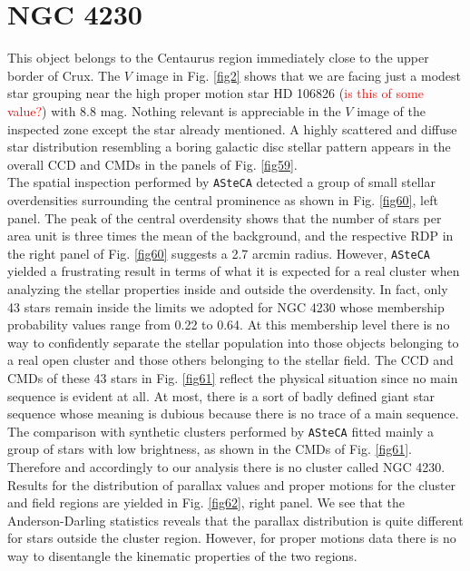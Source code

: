 \documentclass{aa}
\begin{document}
\section{NGC 4230}

This object belongs to the Centaurus region immediately close to the upper
border of Crux. The $V$ image in Fig. \ref{fig2} shows that we are facing just a
modest star grouping near the high proper motion star HD 106826
(\textcolor{red}{is this of some value?}) with 8.8 mag. Nothing relevant is
appreciable in the $V$ image of the inspected zone except the star already
mentioned. A highly scattered and diffuse star distribution resembling a boring
galactic disc stellar pattern appears in the overall CCD and CMDs in the panels
of Fig. \ref{fig59}.\\

The spatial inspection performed by \texttt{ASteCA} detected a group of small
stellar overdensities surrounding the central prominence as shown in Fig.
\ref{fig60}, left panel. The peak of the central overdensity shows that the
number of stars per area unit is three times the mean of the background, and the
respective RDP in the right panel of Fig. \ref{fig60} suggests a 2.7 arcmin
radius. However, \texttt{ASteCA} yielded a frustrating result in terms of what
it is expected for a real cluster when analyzing the stellar properties inside
and outside the overdensity. In fact, only 43 stars remain inside the limits we
adopted for NGC 4230 whose membership probability values range from 0.22 to
0.64. At this membership level there is no way to confidently separate the
stellar population into those objects belonging to a real open cluster and those
others belonging to the stellar field. The CCD and CMDs of these 43 stars
in Fig. \ref{fig61} reflect the physical situation since no main sequence is
evident at all. At most, there is a sort of badly defined giant star sequence
whose meaning is dubious because there is no trace of a main sequence. The
comparison with synthetic clusters performed by \texttt{ASteCA} fitted mainly
a group of stars with low brightness, as shown in the CMDs of Fig. \ref{fig61}.
Therefore and accordingly to our analysis there is no cluster called NGC 4230.\\

Results for the distribution of parallax values and proper motions for the
cluster and field regions are yielded in Fig. \ref{fig62}, right panel.
We see that the Anderson-Darling statistics reveals that the parallax
distribution is quite different for stars outside the cluster region. However,
for proper motions data there is no way to disentangle the kinematic properties
of the two regions.\\
\end{document}

